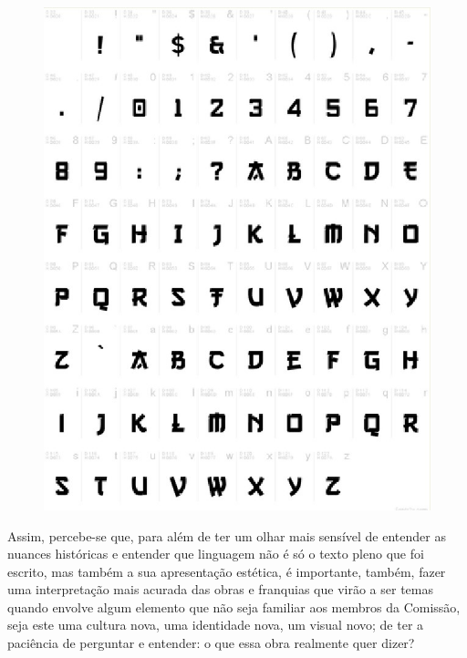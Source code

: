 \begin{figure}[H]
    \centering
    \includegraphics[width=0.7\linewidth]{textos/img/exemplo_chop_suey_gang_of_three.jpg}
\end{figure}

Assim, percebe-se que, para além de ter um olhar mais sensível de entender as nuances históricas e entender que linguagem não é só o texto pleno que foi escrito, mas também a sua apresentação estética, é importante, também, fazer uma interpretação mais acurada das obras e franquias que virão a ser temas quando envolve algum elemento que não seja familiar aos membros da Comissão, seja este uma cultura nova, uma identidade nova, um visual novo; de ter a paciência de perguntar e entender: o que essa obra realmente quer dizer? 